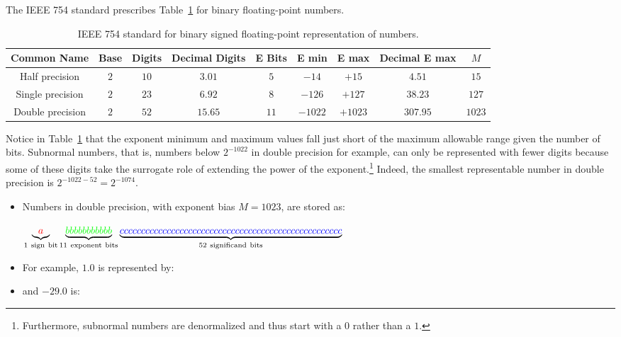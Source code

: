 The IEEE 754 standard prescribes Table~\ref{table:IEEEFloatingPoint} for binary floating-point numbers.

\begin{table}[htp]
\caption{IEEE 754 standard for binary signed floating-point representation of numbers.}
\begin{center}
\begin{tabular}{ccccccccc}
\hline
Common Name & Base & Digits & Decimal Digits & E Bits & E min & E max & Decimal E max & $M$\\
\hline
Half precision  & $2$ & $10$ & $3.01$ & $5$ & $-14$ & $+15$ & $4.51$ & $15$\\
Single precision  & $2$ & $23$ & $6.92$ & $8$ & $-126$ & $+127$ & $38.23$ & $127$\\
Double precision  & $2$ & $52$ & $15.65$ & $11$ & $-1022$ & $+1023$ & $307.95$ & $1023$\\
\hline
\end{tabular}
\end{center}
\label{table:IEEEFloatingPoint}
\end{table}%

Notice in Table~\ref{table:IEEEFloatingPoint} that the exponent minimum and maximum values fall just short of the maximum allowable range given the number of bits. Subnormal numbers, that is, numbers below $2^{-1022}$ in double precision for example, can only be represented with fewer digits because some of these digits take the surrogate role of extending the power of the exponent.\footnote{Furthermore, subnormal numbers are denormalized and thus start with a $0$ rather than a $1$.} Indeed, the smallest representable number in double precision is $2^{-1022-52} = 2^{-1074}$.

\begin{example}
\begin{itemize}
\item Numbers in double precision, with exponent bias $M=1023$, are stored as:

$\underbrace{\color{red} a}_{\rm 1~sign~bit}\underbrace{\color{green} bbbbbbbbbbb}_{\rm 11~exponent~bits}\underbrace{\color{blue} cccccccccccccccccccccccccccccccccccccccccccccccccccc}_{\rm 52~significand~bits}$

\item For example, $1.0$ is represented by:

{}{}{}

\item and $-29.0$ is:

{}{}{}
\end{itemize}
\end{example}

